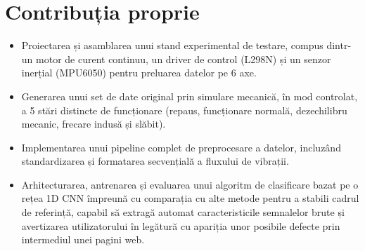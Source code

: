 \section{Contribuția proprie}

	\begin{itemize}
		\item Proiectarea și asamblarea unui stand experimental de testare, compus dintr-un motor de curent continuu, un driver de control (L298N) și un senzor inerțial (MPU6050) pentru preluarea datelor pe 6 axe. \cite{invensense:mpu6050_datasheet, handson:l298n_module}
		\item Generarea unui set de date original prin simulare mecanică, în mod controlat, a 5 stări distincte de funcționare (repaus, funcționare normală, dezechilibru mecanic, frecare indusă și slăbit).
		\item Implementarea unui pipeline complet de preprocesare a datelor, incluzând standardizarea și formatarea secvențială a fluxului de vibrații.
		\item Arhitecturarea, antrenarea și evaluarea unui algoritm de clasificare bazat pe o rețea 1D CNN împreună cu comparația cu alte metode pentru a stabili cadrul de referință, capabil să extragă automat caracteristicile semnalelor brute și avertizarea utilizatorului în legătură cu apariția unor posibile defecte prin intermediul unei pagini web.
	\end{itemize}
